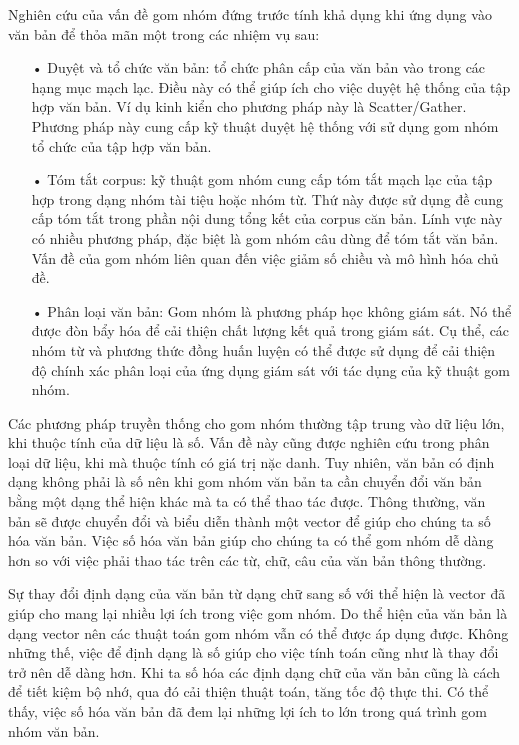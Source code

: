 
Nghiên cứu của vấn đề gom nhóm đứng trước tính khả dụng khi ứng dụng vào văn bản để thỏa mãn một trong các nhiệm vụ sau:
\begin{enumerate}
\item[•]Duyệt và tổ chức văn bản: tổ chức phân cấp của văn bản vào trong các hạng mục mạch lạc.
Điều này có thể giúp ích cho việc duyệt hệ thống của tập hợp văn bản.
Ví dụ kinh kiển cho phương pháp này là Scatter/Gather.
Phương pháp này cung cấp kỹ thuật duyệt hệ thống với sử dụng gom nhóm tổ chức của tập hợp văn bản.
\item[•]Tóm tắt corpus: kỹ thuật gom nhóm cung cấp tóm tắt mạch lạc của tập hợp trong dạng nhóm tài tiệu hoặc nhóm từ.
Thứ này được sử dụng đề cung cấp tóm tắt trong phần nội dung tổng kết của corpus căn bản.
Lính vực này có nhiều phương pháp, đặc biệt là gom nhóm câu dùng để tóm tắt văn bản.
Vấn đề của gom nhóm liên quan đến việc giảm số chiều và mô hình hóa chủ đề. 
\item[•]Phân loại văn bản: Gom nhóm là phương pháp học không giám sát.
Nó thể được đòn bẩy hóa để cải thiện chất lượng kết quả trong giám sát.
Cụ thể, các nhóm từ và phương thức đồng huấn luyện có thể được sử dụng để cải thiện độ chính xác phân loại của ứng dụng giám sát với tác dụng của kỹ thuật gom nhóm.
\end{enumerate}

Các phương pháp truyền thống cho gom nhóm thường tập trung vào dữ liệu lớn, khi thuộc tính của dữ liệu là số.
Vấn đề này cũng được nghiên cứu trong phân loại dữ liệu, khi mà thuộc tính có giá trị nặc danh.
Tuy nhiên, văn bản có định dạng không phải là số nên khi gom nhóm văn bản ta cần chuyển đổi văn bản bằng một dạng thể hiện khác mà ta có thể thao tác được.
Thông thường, văn bản sẽ được chuyển đổi và biểu diễn thành một vector để giúp cho chúng ta số hóa văn bản.
Việc số hóa văn bản giúp cho chúng ta có thể gom nhóm dễ dàng hơn so với việc phải thao tác trên các từ, chữ, câu của văn bản thông thường.

Sự thay đổi định dạng của văn bản từ dạng chữ sang số với thể hiện là vector đã giúp cho mang lại nhiều lợi ích trong việc gom nhóm.
Do thể hiện của văn bản là dạng vector nên các thuật toán gom nhóm vẫn có thể được áp dụng được.
Không những thế, việc để định dạng là số giúp cho việc tính toán cũng như là thay đổi trở nên dễ dàng hơn.
Khi ta số hóa các định dạng chữ của văn bản cũng là cách để tiết kiệm bộ nhớ, qua đó cải thiện thuật toán, tăng tốc độ thực thi.
Có thể thấy, việc số hóa văn bản đã đem lại những lợi ích to lớn trong quá trình gom nhóm văn bản.

